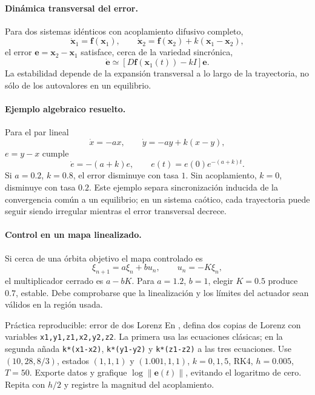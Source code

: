 \paragraph{Dinámica transversal del error.}
Para dos sistemas idénticos con acoplamiento difusivo completo,
\[
 \dot{\mathbf x}_1=\mathbf f(\mathbf x_1),\qquad
 \dot{\mathbf x}_2=\mathbf f(\mathbf x_2)+k(\mathbf x_1-\mathbf x_2),
\]
el error \(\mathbf e=\mathbf x_2-\mathbf x_1\) satisface, cerca de la variedad
sincrónica,
\[
 \dot{\mathbf e}\simeq
 [D\mathbf f(\mathbf x_1(t))-kI]\mathbf e.
\]
La estabilidad depende de la expansión transversal a lo largo de la trayectoria, no
sólo de los autovalores en un equilibrio.

\paragraph{Ejemplo algebraico resuelto.}
Para el par lineal
\[
 \dot x=-ax,\qquad \dot y=-ay+k(x-y),
\]
\(e=y-x\) cumple
\[
 \dot e=-(a+k)e,\qquad e(t)=e(0)e^{-(a+k)t}.
\]
Si \(a=0.2\), \(k=0.8\), el error disminuye con tasa \(1\). Sin acoplamiento,
\(k=0\), disminuye con tasa \(0.2\). Este ejemplo separa sincronización inducida de
la convergencia común a un equilibrio; en un sistema caótico, cada trayectoria puede
seguir siendo irregular mientras el error transversal decrece.

\paragraph{Control en un mapa linealizado.}
Si cerca de una órbita objetivo el mapa controlado es
\[
 \xi_{n+1}=a\xi_n+b u_n,\qquad u_n=-K\xi_n,
\]
el multiplicador cerrado es \(a-bK\). Para \(a=1.2\), \(b=1\), elegir \(K=0.5\)
produce \(0.7\), estable. Debe comprobarse que la linealización y los límites del
actuador sean válidos en la región usada.

\begin{activitybox}{Práctica reproducible: error de dos Lorenz}
En , defina dos copias de Lorenz con variables
\texttt{x1,y1,z1,x2,y2,z2}. La primera usa las ecuaciones clásicas; en la segunda
añada \texttt{k*(x1-x2)}, \texttt{k*(y1-y2)} y \texttt{k*(z1-z2)} a las tres
ecuaciones. Use \((10,28,8/3)\), estados \((1,1,1)\) y \((1.001,1,1)\),
\(k=0,1,5\), RK4, \(h=0.005\), \(T=50\). Exporte datos y grafique
\(\log\|\mathbf e(t)\|\), evitando el logaritmo de cero. Repita con \(h/2\) y
registre la magnitud del acoplamiento.
\end{activitybox}

